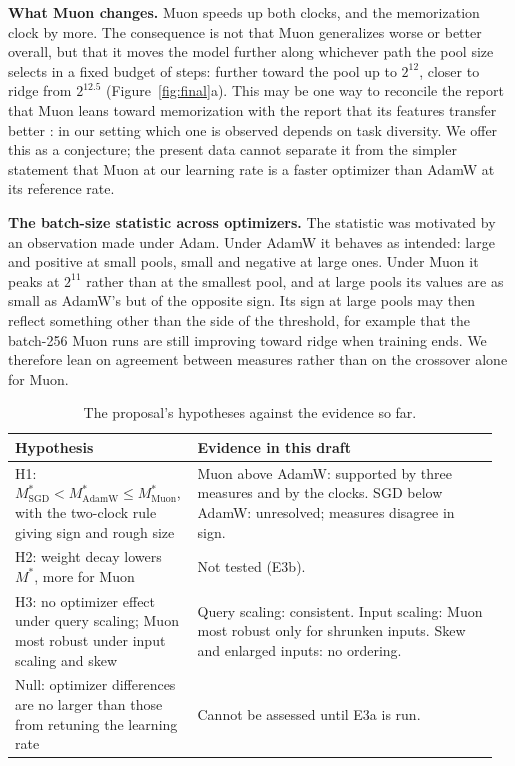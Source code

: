 \documentclass[11pt]{article}
\newcommand{\Mstar}{M^{*}}
\begin{document}
\textbf{What Muon changes.} Muon speeds up both clocks, and the memorization clock by more. The consequence is not that Muon generalizes worse or better overall, but that it moves the model further along whichever path the pool size selects in a fixed budget of steps: further toward the pool up to $2^{12}$, closer to ridge from $2^{12.5}$ (Figure~\ref{fig:final}a). This may be one way to reconcile the report that Muon leans toward memorization \citep{liu2026} with the report that its features transfer better \citep{ruan2026}: in our setting which one is observed depends on task diversity. We offer this as a conjecture; the present data cannot separate it from the simpler statement that Muon at our learning rate is a faster optimizer than AdamW at its reference rate.

\textbf{The batch-size statistic across optimizers.} The statistic was motivated by an observation made under Adam. Under AdamW it behaves as intended: large and positive at small pools, small and negative at large ones. Under Muon it peaks at $2^{11}$ rather than at the smallest pool, and at large pools its values are as small as AdamW's but of the opposite sign. Its sign at large pools may then reflect something other than the side of the threshold, for example that the batch-256 Muon runs are still improving toward ridge when training ends. We therefore lean on agreement between measures rather than on the crossover alone for Muon.

\begin{table}[!htb]
\centering\small
\caption{The proposal's hypotheses against the evidence so far.}
\label{tab:hyp}
\begin{tabular}{@{}p{0.36\linewidth}p{0.6\linewidth}@{}}
\toprule
Hypothesis & Evidence in this draft \\
\midrule
H1: $\Mstar_{\mathrm{SGD}} < \Mstar_{\mathrm{AdamW}} \le \Mstar_{\mathrm{Muon}}$, with the two-clock rule giving sign and rough size & Muon above AdamW: supported by three measures and by the clocks. SGD below AdamW: unresolved; measures disagree in sign. \\
\addlinespace
H2: weight decay lowers $\Mstar$, more for Muon & Not tested (E3b). \\
\addlinespace
H3: no optimizer effect under query scaling; Muon most robust under input scaling and skew & Query scaling: consistent. Input scaling: Muon most robust only for shrunken inputs. Skew and enlarged inputs: no ordering. \\
\addlinespace
Null: optimizer differences are no larger than those from retuning the learning rate & Cannot be assessed until E3a is run. \\
\bottomrule
\end{tabular}
\end{table}
\end{document}
